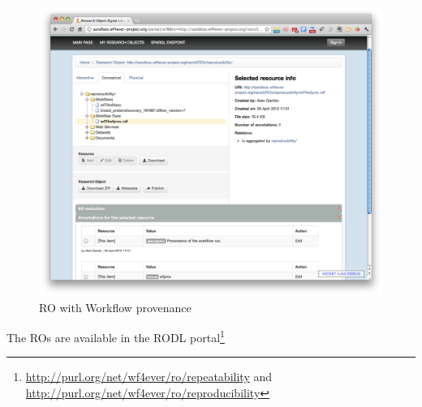 \begin{figure}[h]
  \centering
  \includegraphics[width=\picwidth]{Figures/reproduce}
\caption{RO with Workflow provenance}
  \label{fig:reproduce}
\end{figure}


The ROs are available in the RODL
portal\footnote{\url{http://purl.org/net/wf4ever/ro/repeatability} and
  \url{http://purl.org/net/wf4ever/ro/reproducibility}}
